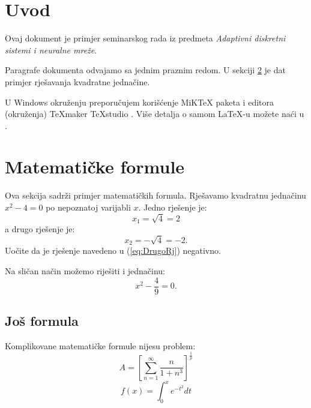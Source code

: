 \documentclass[12pt]{SeminarskiADS}
\begin{document}
\maketitle 

%
%

\section{Uvod}

Ovaj dokument je primjer seminarskog rada iz predmeta \emph{Adaptivni diskretni sistemi i neuralne mreže}.

Paragrafe dokumenta odvajamo sa jednim praznim redom. U sekciji \ref{sec:mat} je dat primjer rješavanja kvadratne jednačine.

U Windows okruženju preporučujem korišćenje MiKTeX paketa \cite{Miktex} i editora (okruženja) TeXmaker \cite{TeXmaker} TeXstudio \cite{TexStudio}. Više detalja o samom \LaTeX-u možete naći u \cite{LatexMan,LatexMan2}.



\section{Matematičke formule}
\label{sec:mat}

Ova sekcija sadrži primjer matematičkih formula. Rješavamo kvadratnu jednačinu $x^2-4=0$ po nepoznatoj varijabli $x$.
Jedno rješenje je:
$$ x_1=\sqrt{4}=2 $$ 
a drugo rješenje je:
\begin{equation}
\label{eq:DrugoRj}
x_2=-\sqrt{4}=-2.
\end{equation}
Uočite da je rješenje navedeno u (\ref{eq:DrugoRj}) negativno.

Na sličan način možemo riješiti i jednačinu:
$$ x^2-\frac{4}{9}=0.$$

\subsection{Još formula}
Komplikovane matematičke formule nijesu problem:
$$ A = \left[ \sum\limits_{n=1}^{\infty} 
\frac{n}{1+n^3} \right]^{\frac{1}{p}}$$
\begin{equation}
\label{eq:funkcija}
f(x)=\int_0^x e^{-t^2} dt
\end{equation}
\end{document}
